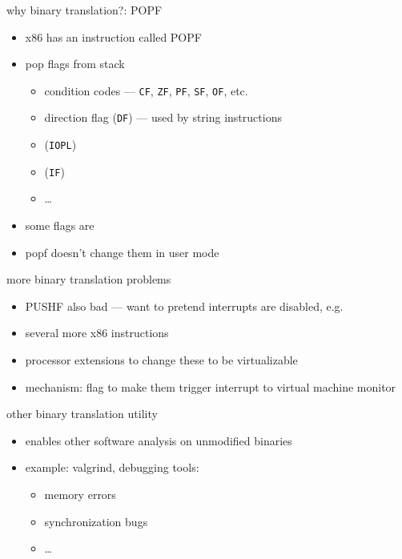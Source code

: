 \begin{frame}{why binary translation?: POPF}
    \begin{itemize}
    \item x86 has an instruction called POPF
    \item pop flags from stack
    \begin{itemize}
    \item condition codes --- {\tt CF}, {\tt ZF}, {\tt PF}, {\tt SF}, {\tt OF}, etc.
    \item direction flag ({\tt DF}) --- used by string instructions
    \item \textbf<2>{} ({\tt IOPL})
    \item \textbf<2>{} ({\tt IF})
    \item \ldots
    \end{itemize}
    \item<2> some flags are 
    \item<2> popf  doesn't change them in user mode
    \end{itemize}
\end{frame}

\begin{frame}{more binary translation problems}
    \begin{itemize}
    \item PUSHF also bad --- want to pretend interrupts are disabled, e.g.
    \item several more x86 instructions
    \vspace{.5cm}
    \item processor extensions to change these to be virtualizable
    \item mechanism: flag to make them trigger interrupt to virtual machine monitor
    \end{itemize}
\end{frame}

\begin{frame}{other binary translation utility}
    \begin{itemize}
    \item enables other software analysis on unmodified binaries
    \item example: valgrind, debugging tools:   
        \begin{itemize}
        \item memory errors
        \item synchronization bugs
        \item \ldots
        \end{itemize}
    \end{itemize}
\end{frame}

